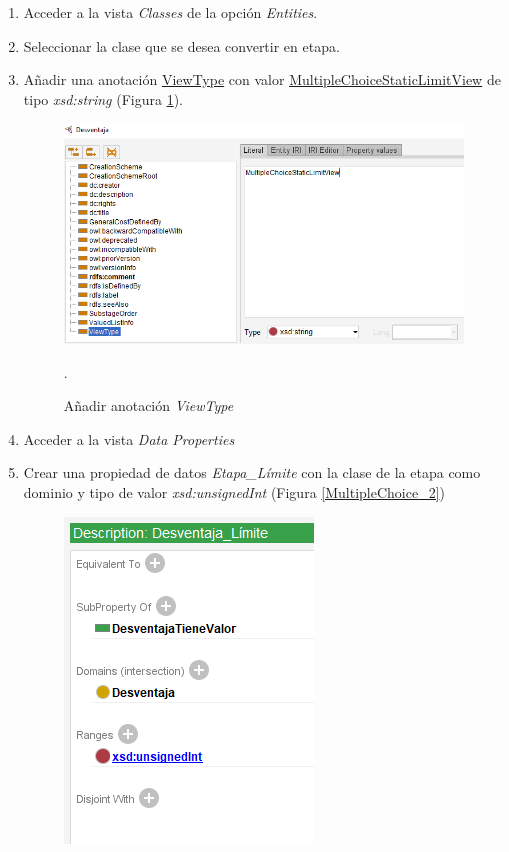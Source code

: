 \begin{enumerate}
    \item Acceder a la vista \textit{Classes} de la opción \textit{Entities}.
    \item Seleccionar la clase que se desea convertir en etapa.
    \item Añadir una anotación \underline{ViewType} con valor \underline{MultipleChoiceStaticLimitView} de tipo \textit{xsd:string}
    (Figura \ref*{MultipleChoice_1}).
    \begin{figure}[H]
        \centering
        \includegraphics[scale=0.6]{Figures/Protege/MultipleChoice_1.png}
        \caption{Añadir anotación \textit{ViewType}}.
        \label{MultipleChoice_1}
    \end{figure}
    \item Acceder a la vista \textit{Data Properties}
    \item Crear una propiedad de datos \textit{Etapa\_Límite} con la clase de la etapa como dominio y tipo de valor 
    \textit{xsd:unsignedInt} (Figura \ref*{MultipleChoice_2})
    \begin{figure}[H]
        \centering
        \includegraphics[scale=0.6]{Figures/Protege/MultipleChoice_2.png}

\end{figure}
\end{enumerate}
